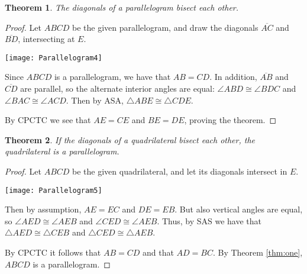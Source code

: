 \documentclass[12pt]{article}
\newcommand{\ol}{\overline}
\newtheorem{thm}{Theorem}
\begin{document}
\begin{thm} \label{thm:four}The diagonals of a parallelogram bisect each other.
\end{thm}
\begin{proof}
Let $ABCD$ be the given parallelogram, and draw the diagonals $\ol{AC}$ and $\ol{BD}$, intersecting at $E$. 
\begin{center}\texttt{[image: Parallelogram4]}\end{center}
Since $ABCD$ is a parallelogram, we have that $AB=CD$. In addition, $\ol{AB}$ and $\ol{CD}$ are parallel, so the alternate interior angles are equal: $\angle ABD\cong \angle BDC$ and $\angle BAC\cong \angle ACD$. Then by ASA, $\triangle ABE\cong \triangle CDE$.

By CPCTC we see that $AE=CE$ and $BE=DE$, proving the theorem.
\end{proof}

\begin{thm} \label{thm:five}If the diagonals of a quadrilateral bisect each other, the quadrilateral is a parallelogram.
\end{thm}
\begin{proof}
Let $ABCD$ be the given quadrilateral, and let its diagonals intersect in $E$. 
\begin{center}\texttt{[image: Parallelogram5]}\end{center}
Then by assumption, $AE=EC$ and $DE=EB$. But also vertical angles are equal, so $\angle AED\cong \angle AEB$ and $\angle CED\cong \angle AEB$. Thus, by SAS we have that $\triangle AED\cong \triangle CEB$ and $\triangle CED\cong \triangle AEB$.

By CPCTC it follows that $AB=CD$ and that $AD=BC$. By Theorem \ref{thm:one}, $ABCD$ is a parallelogram.

\end{proof}
\end{document}

